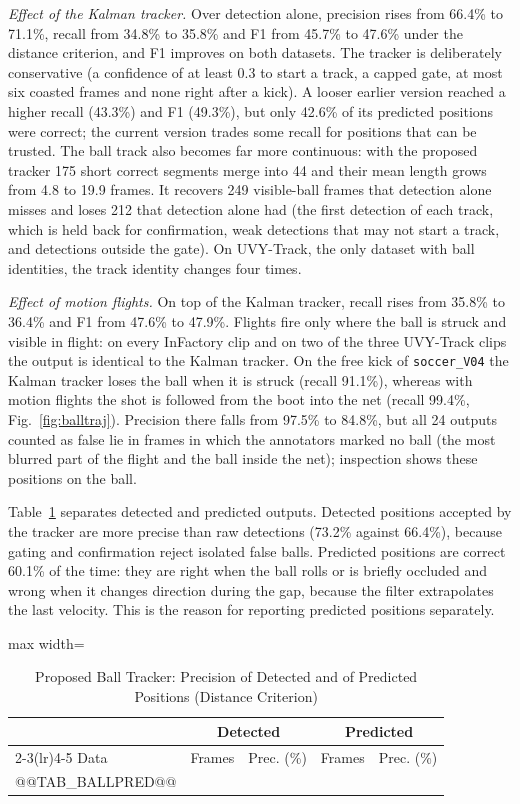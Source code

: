 \documentclass[conference]{IEEEtran}
\begin{document}
\emph{Effect of the Kalman tracker.} Over detection alone, precision rises from
66.4\% to 71.1\%, recall from 34.8\% to 35.8\% and F1 from 45.7\% to 47.6\% under
the distance criterion, and F1 improves on both datasets. The tracker is
deliberately conservative (a confidence of at least 0.3 to start a track, a capped
gate, at most six coasted frames and none right after a kick). A looser earlier
version reached a higher recall (43.3\%) and F1 (49.3\%), but only 42.6\% of its
predicted positions were correct; the current version trades some recall for
positions that can be trusted. The ball track also becomes far more continuous:
with the proposed tracker 175 short correct segments merge into 44 and their mean
length grows from 4.8 to 19.9 frames. It recovers 249 visible-ball frames that
detection alone misses and loses 212 that detection alone had (the first
detection of each track, which is held back for confirmation, weak detections
that may not start a track, and detections outside the gate). On UVY-Track, the
only dataset with ball identities, the track identity changes four times.

\emph{Effect of motion flights.} On top of the Kalman tracker, recall rises from
35.8\% to 36.4\% and F1 from 47.6\% to 47.9\%. Flights fire only where the ball is
struck and visible in flight: on every InFactory clip and on two of the three
UVY-Track clips the output is identical to the Kalman tracker. On the free kick of
\texttt{soccer\_V04} the Kalman tracker loses the ball when it is struck (recall
91.1\%), whereas with motion flights the shot is followed from the boot into the
net (recall 99.4\%, Fig.~\ref{fig:balltraj}). Precision there falls from 97.5\% to
84.8\%, but all 24 outputs counted as false lie in frames in which the annotators
marked no ball (the most blurred part of the flight and the ball inside the net);
inspection shows these positions on the ball.

Table~\ref{tab:ballpred} separates detected and predicted outputs. Detected
positions accepted by the tracker are more precise than raw detections (73.2\%
against 66.4\%), because gating and confirmation reject isolated false balls.
Predicted positions are correct 60.1\% of the time: they are right when the ball
rolls or is briefly occluded and wrong when it changes direction during the gap,
because the filter extrapolates the last velocity. This is the reason for
reporting predicted positions separately.

\begin{table}[t]
\caption{Proposed Ball Tracker: Precision of Detected and of Predicted Positions
(Distance Criterion)}
\label{tab:ballpred}
\centering
\footnotesize
\begin{adjustbox}{max width=\columnwidth}
\begin{tabular}{@{}lrrrr@{}}
\toprule
 & \multicolumn{2}{c}{Detected} & \multicolumn{2}{c}{Predicted} \\
\cmidrule(lr){2-3}\cmidrule(lr){4-5}
Data & Frames & Prec. (\%) & Frames & Prec. (\%) \\
\midrule
@@TAB_BALLPRED@@
\bottomrule
\end{tabular}
\end{adjustbox}
\end{table}
\end{document}
